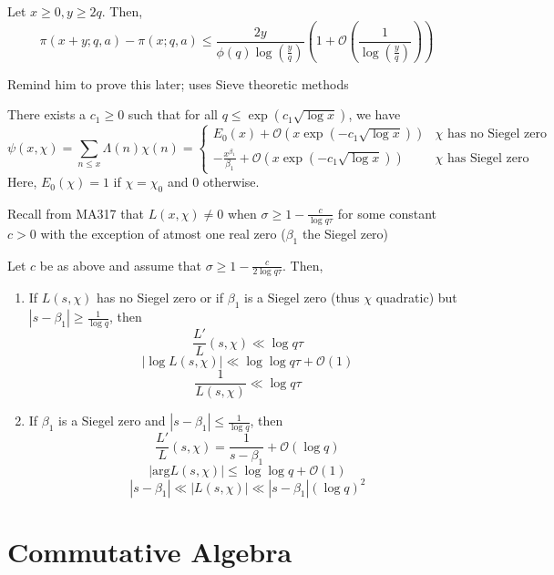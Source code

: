 \documentclass[oneside, 12pt, ]{scrbook}
\theoremstyle{theorem}
\begin{document}
\begin{theorem}
Let $x\geq 0, y \geq 2q$. Then, $$\pi(x+y; q,a) - \pi (x; q,a) \le \frac{2y}{\phi(q) \log (\frac{y}{q})} \left( 1 + \mathcal{O}(\frac{1}{\log (\frac{y}{q})}) \right)$$
\end{theorem}

\textcolor{BrickRed}{Remind him to prove this later; uses Sieve theoretic methods}

\begin{theorem}
There exists a $c_{1} \geq 0$ such that for all $q \le \exp (c_{1} \sqrt{\log x})$, we have $$\psi(x, \chi) = \sum_{n \le x}\Lambda (n) \chi (n) = \begin{cases} E_{0}(x) + \mathcal{O} (x\exp(-c_{1}\sqrt{\log x})) & \chi \text{ has no Siegel zero} \\ -\frac{x^{\beta_{1}}}{\beta_{1}} + \mathcal{O} (x\exp(-c_{1}\sqrt{\log x})) & \chi \text{ has Siegel zero} \end{cases}$$ Here, $E_{0}(\chi) = 1$ if $\chi = \chi_{0}$ and $0$ otherwise. 
\end{theorem}

Recall from MA317 that $L(x,\chi) \neq 0$ when $\sigma \geq  1 - \frac{c}{\log q\tau}$ for some constant $c>0$ with the exception of atmost one real zero ($\beta_{1}$ the Siegel zero)

\begin{proposition}
Let $c$ be as above and assume that $\sigma \geq 1 - \frac{c}{2 \log q \tau}$. Then, 
\begin{enumerate}
\item If $L(s,\chi)$ has no Siegel zero or if $\beta_{1}$ is a Siegel zero (thus $\chi$ quadratic) but $|s- \beta_{1}| \geq \frac{1}{\log q}$, then $$\frac{L'}{L}(s, \chi) \ll \log q \tau$$ $$|\log L(s,\chi)| \ll \log \log q\tau + \mathcal{O}(1)$$ $$\frac{1}{L(s,\chi)} \ll \log q\tau$$
\item If $\beta_{1}$ is a Siegel zero and $|s - \beta_{1}| \le \frac{1}{\log q}$, then $$\frac{L'}{L}(s, \chi) = \frac{1}{s- \beta_{1}} + \mathcal{O}(\log q)$$ $$|\mathrm{arg} L(s,\chi)| \le \log \log q + \mathcal{O}(1)$$ $$|s- \beta_{1}| \ll |L(s,\chi)| \ll |s-\beta_{1}|(\log q)^2$$
\end{enumerate}
\end{proposition}


















\part{Commutative Algebra}
\end{document}
